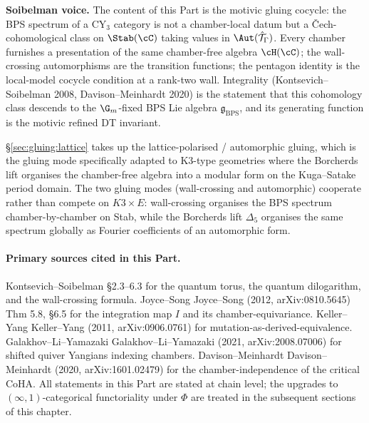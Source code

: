 \bigskip
\noindent \textbf{Soibelman voice.} The content of this Part is the
motivic gluing cocycle: the BPS spectrum of a CY$_3$ category is not a
chamber-local datum but a \v{C}ech-cohomological class on $\Stab(\cC)$
taking values in $\Aut(\hat{\mathcal{T}}_\Gamma)$. Every chamber furnishes a
presentation of the same chamber-free algebra $\cH(\cC)$; the
wall-crossing automorphisms are the transition functions; the pentagon
identity is the local-model cocycle condition at a rank-two wall.
Integrality (Kontsevich--Soibelman 2008, Davison--Meinhardt 2020) is
the statement that this cohomology class descends to the $\G_m$-fixed
BPS Lie algebra $\mathfrak{g}_{\mathrm{BPS}}$, and its generating function is the
motivic refined DT invariant.

\S\ref{sec:gluing:lattice} takes up the lattice-polarised / automorphic gluing, which is the
gluing mode specifically adapted to K3-type geometries where the Borcherds
lift organises the chamber-free algebra into a modular form on the
Kuga--Satake period domain. The two gluing modes (wall-crossing and
automorphic) cooperate rather than compete on $K3 \times E$: wall-crossing
organises the BPS spectrum chamber-by-chamber on Stab, while the Borcherds
lift $\Delta_5$ organises the same spectrum globally as Fourier coefficients
of an automorphic form.

\bigskip
\paragraph{Primary sources cited in this Part.}
Kontsevich--Soibelman \cite{KS2008} \S 2.3--6.3 for the quantum torus, the
quantum dilogarithm, and the wall-crossing formula. Joyce--Song
Joyce--Song (2012, arXiv:0810.5645) Thm 5.8, \S 6.5 for the integration map $I$ and its
chamber-equivariance. Keller--Yang Keller--Yang (2011, arXiv:0906.0761) for
mutation-as-derived-equivalence. Galakhov--Li--Yamazaki
Galakhov--Li--Yamazaki (2021, arXiv:2008.07006) for shifted quiver Yangians indexing
chambers. Davison--Meinhardt Davison--Meinhardt (2020, arXiv:1601.02479) for the
chamber-independence of the critical CoHA. All statements in this Part are
stated at chain level; the upgrades to $(\infty, 1)$-categorical functoriality
under $\Phi$ are treated in the subsequent sections of this chapter.
